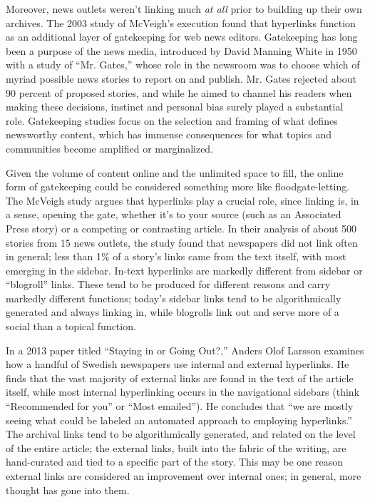 Moreover, news outlets weren't linking much \emph{at all} prior to building up their own archives. The 2003 study of McVeigh's execution found that hyperlinks function as an additional layer of gatekeeping for web news editors. Gatekeeping has long been a purpose of the news media, introduced by David Manning White in 1950 with a study of ``Mr. Gates,'' whose role in the newsroom was to choose which of myriad possible news stories to report on and publish. Mr. Gates rejected about 90 percent of proposed stories, and while he aimed to channel his readers when making these decisions, instinct and personal bias surely played a substantial role. Gatekeeping studies focus on the selection and framing of what defines newsworthy content, which has immense consequences for what topics and communities become amplified or marginalized.

Given the volume of content online and the unlimited space to fill, the online form of gatekeeping could be considered something more like floodgate-letting. The McVeigh study argues that hyperlinks play a crucial role, since linking is, in a sense, opening the gate, whether it's to your source (such as an Associated Press story) or a competing or contrasting article. In their analysis of about 500 stories from 15 news outlets, the study found that newspapers did not link often in general; less than 1\% of a story's links came from the text itself, with most emerging in the sidebar. In-text hyperlinks are markedly different from sidebar or ``blogroll'' links. These tend to be produced for different reasons and carry markedly different functions; today's sidebar links tend to be algorithmically generated and always linking in, while blogrolls link out and serve more of a social than a topical function.\autocite[745]{de_maeyer_towards_2013}

In a 2013 paper titled ``Staying in or Going Out?,'' Anders Olof Larsson examines how a handful of Swedish newspapers use internal and external hyperlinks. He finds that the vast majority of external links are found in the text of the article itself, while most internal hyperlinking occurs in the navigational sidebars (think ``Recommended for you'' or ``Most emailed''). He concludes that ``we are mostly seeing what could be labeled an automated approach to employing hyperlinks.''\autocite[738]{larsson_staying_2013} The archival links tend to be algorithmically generated, and related on the level of the entire article; the external links, built into the fabric of the writing, are hand-curated and tied to a specific part of the story. This may be one reason external links are considered an improvement over internal ones; in general, more thought has gone into them.

